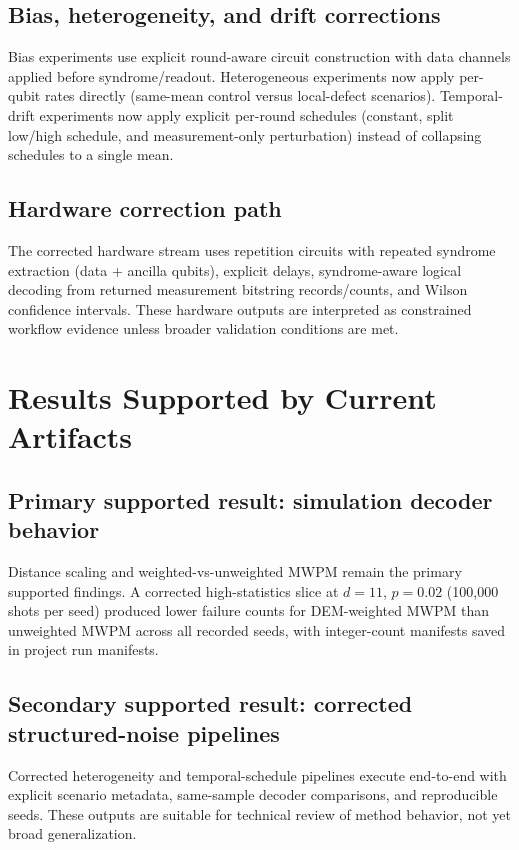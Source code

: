 \documentclass[11pt]{article}
\begin{document}
\subsection{Bias, heterogeneity, and drift corrections}
Bias experiments use explicit round-aware circuit construction with data channels applied before syndrome/readout. Heterogeneous experiments now apply per-qubit rates directly (same-mean control versus local-defect scenarios). Temporal-drift experiments now apply explicit per-round schedules (constant, split low/high schedule, and measurement-only perturbation) instead of collapsing schedules to a single mean.

\subsection{Hardware correction path}
The corrected hardware stream uses repetition circuits with repeated syndrome extraction (data + ancilla qubits), explicit delays, syndrome-aware logical decoding from returned measurement bitstring records/counts, and Wilson confidence intervals. These hardware outputs are interpreted as constrained workflow evidence unless broader validation conditions are met.

\section{Results Supported by Current Artifacts}
\subsection{Primary supported result: simulation decoder behavior}
Distance scaling and weighted-vs-unweighted MWPM remain the primary supported findings. A corrected high-statistics slice at $d=11$, $p=0.02$ (100{,}000 shots per seed) produced lower failure counts for DEM-weighted MWPM than unweighted MWPM across all recorded seeds, with integer-count manifests saved in project run manifests.

\subsection{Secondary supported result: corrected structured-noise pipelines}
Corrected heterogeneity and temporal-schedule pipelines execute end-to-end with explicit scenario metadata, same-sample decoder comparisons, and reproducible seeds. These outputs are suitable for technical review of method behavior, not yet broad generalization.
\end{document}
